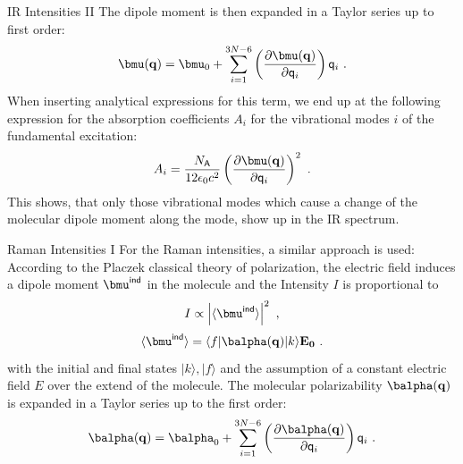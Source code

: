 \documentclass[t]{beamer}
\begin{document}
	\begin{frame}{IR Intensities II}
		The dipole moment is then expanded in a Taylor series up to first order:
	    \begin{equation*}
	        \bmu(\mathbf{q}) = \bmu_0 + \sum_{i=1}^{3N-6} \left( \frac{\partial\bmu(\mathbf{q})}{\partial \mathsf{q}_i} \right) \mathsf{q}_i~.
	    \end{equation*}
	    When inserting analytical expressions for this term, we end up at the following expression for the absorption coefficients $A_i$ for the vibrational modes $i$ of the fundamental excitation:
	    \begin{equation*}
	        A_i = \frac{N_\mathsf{A}}{12\epsilon_0c^2} \left( \frac{\partial\bmu(\mathbf{q})}{\partial \mathsf{q}_i} \right)^2~.
	    \end{equation*}
	    This shows, that only those vibrational modes which cause a change of the molecular dipole moment along the mode, show up in the IR spectrum.
	\end{frame}
	\begin{frame}{Raman Intensities I}
	    For the Raman intensities, a similar approach is used: According to the Placzek classical theory of polarization, the electric field induces a dipole moment $\bmu^\mathsf{ind}$ in the molecule and the Intensity $I$ is proportional to 
	    \begin{equation*}
	        I \propto \left| \langle \bmu^\mathsf{ind} \rangle \right|^2~,
	    \end{equation*}
	    \begin{equation*}
	        \langle \bmu^\mathsf{ind} \rangle = \langle f | \balpha(\mathbf{q}) | k \rangle \mathbf{E_0}~.
	    \end{equation*}
	    with the initial and final states $|k\rangle,|f\rangle$ and the assumption of a constant electric field $E$ over the extend of the molecule. The molecular polarizability $\balpha(\mathbf{q})$ is expanded in a Taylor series up to the first order:
	    \begin{equation*}
	        \balpha(\mathbf{q}) = \balpha_0 + \sum_{i=1}^{3N-6} \left( \frac{\partial\balpha(\mathbf{q})}{\partial \mathsf{q}_i} \right) \mathsf{q}_i~.
	    \end{equation*}
	\end{frame}
\end{document}
